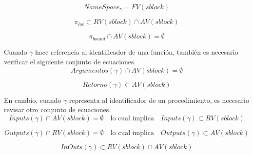 \documentclass{article}
\begin{document}


\begin{equation*}
NameSpace_{\gamma} = FV(sblock)
\end{equation*}

\begin{equation*}
\pi_{loc} \subset RV(sblock) \cap AV(sblock)
\end{equation*}

\begin{equation*}
\pi_{bound} \cap AV(sblock) = \emptyset
\end{equation*}

Cuando $\gamma$ hace referencia al identificador de una función, también es necesario verificar el siguiente conjunto de ecuaciones.
\begin{equation*}
Argumentos(\gamma) \cap AV(sblock) = \emptyset
\end{equation*}

\begin{equation*}
Retorno(\gamma) \subset AV(sblock)
\end{equation*}

En cambio, cuando $\gamma$ representa al identificador de un procedimiento, es necesario revisar otro conjunto de ecuaciones.
\begin{equation*}
Inputs(\gamma) \cap AV(sblock) = \emptyset
\quad \text{lo cual implica} \quad
Inputs(\gamma) \subset RV(sblock)
\end{equation*}

\begin{equation*}
Outputs(\gamma) \cap RV(sblock) = \emptyset
\quad \text{lo cual implica} \quad
Outputs(\gamma) \subset AV(sblock)
\end{equation*}

\begin{equation*}
InOuts(\gamma) \subset RV(sblock) \cap AV(sblock)
\end{equation*}
\end{document}
